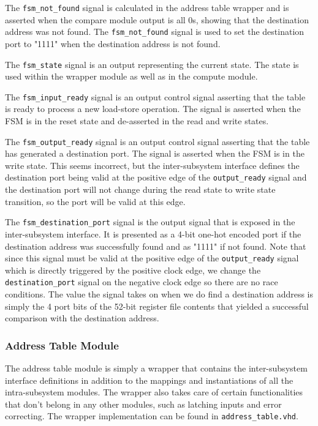 \documentclass{article}
\begin{document}
The \texttt{fsm\_not\_found} signal is calculated in the address table wrapper and is asserted when the compare module output is all 0s, showing that the destination address was not found. The \texttt{fsm\_not\_found} signal is used to set the destination port to "1111" when the destination address is not found.

The \texttt{fsm\_state} signal is an output representing the current state. The state is used within the wrapper module as well as in the compute module.

The \texttt{fsm\_input\_ready} signal is an output control signal asserting that the table is ready to process a new load-store operation. The signal is asserted when the FSM is in the reset state and de-asserted in the read and write states.

The \texttt{fsm\_output\_ready} signal is an output control signal asserting that the table has generated a destination port. The signal is asserted when the FSM is in the write state. This seems incorrect, but the inter-subsystem interface defines the destination port being valid at the positive edge of the \texttt{output\_ready} signal and the destination port will not change during the read state to write state transition, so the port will be valid at this edge.

The \texttt{fsm\_destination\_port} signal is the output signal that is exposed in the inter-subsystem interface. It is presented as a 4-bit one-hot encoded port if the destination address was successfully found and as "1111" if not found. Note that since this signal must be valid at the positive edge of the \texttt{output\_ready} signal which is directly triggered by the positive clock edge, we change the \texttt{destination\_port} signal on the negative clock edge so there are no race conditions. The value the signal takes on when we do find a destination address is simply the 4 port bits of the 52-bit register file contents that yielded a successful comparison with the destination address.

\subsubsection{Address Table Module}

The address table module is simply a wrapper that contains the inter-subsystem interface definitions in addition to the mappings and instantiations of all the intra-subsystem modules. The wrapper also takes care of certain functionalities that don't belong in any other modules, such as latching inputs and error correcting. The wrapper implementation can be found in \texttt{address\_table.vhd}.
\end{document}
